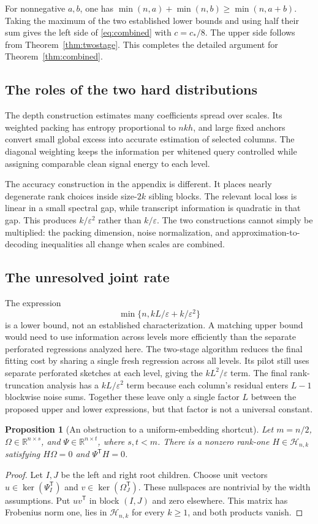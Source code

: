 \documentclass[11pt]{article}
\newtheorem{proposition}[theorem]{Proposition}
\theoremstyle{remark}
\newcommand{\R}{\mathbb R}
\newcommand{\Hclass}{\mathcal H_{n,k}}
\newcommand{\eps}{\varepsilon}
\begin{document}
For nonnegative $a,b$, one has
$\min(n,a)+\min(n,b)\ge\min(n,a+b)$.
Taking the maximum of the two established lower bounds and using half their
sum gives the left side of \eqref{eq:combined} with $c=c_*/8$.
The upper side follows from Theorem~\ref{thm:twostage}.
This completes the detailed argument for Theorem~\ref{thm:combined}.

\subsection{The roles of the two hard distributions}

The depth construction estimates many coefficients spread over scales. Its
weighted packing has entropy proportional to $nkh$, and large fixed anchors
convert small global excess into accurate estimation of selected columns.
The diagonal weighting keeps the information per whitened query controlled
while assigning comparable clean signal energy to each level.

The accuracy construction in the appendix is different. It places nearly
degenerate rank choices inside size-$2k$ sibling blocks. The relevant local
loss is linear in a small spectral gap, while transcript information is
quadratic in that gap. This produces $k/\eps^2$ rather than $k/\eps$.
The two constructions cannot simply be multiplied: the packing dimension,
noise normalization, and approximation-to-decoding inequalities all change
when scales are combined.

\subsection{The unresolved joint rate}

The expression
\[
 \min\{n,kL/\eps+k/\eps^2\}
\]
is a lower bound, not an established characterization. A matching upper
bound would need to use information across levels more efficiently than the
separate perforated regressions analyzed here. The two-stage algorithm reduces the final fitting cost by sharing a single
fresh regression across all levels. Its pilot still uses separate perforated
sketches at each level, giving the $kL^2/\eps$ term. The final rank-truncation
analysis has a $kL/\eps^2$ term because each column's residual enters $L-1$
blockwise noise sums. Together these leave only a single factor $L$ between
the proposed upper and lower expressions, but that factor is not a universal
constant.

\begin{proposition}[An obstruction to a uniform-embedding shortcut]\label{prop:nullspace}
Let $m=n/2$, $\Omega\in\R^{n\times s}$, and $\Psi\in\R^{n\times t}$,
where $s,t<m$. There is a nonzero rank-one $H\in\Hclass$ satisfying
$H\Omega=0$ and $\Psi^{\mathsf T}H=0$.
\end{proposition}
\begin{proof}
Let $I,J$ be the left and right root children. Choose unit vectors
$u\in\ker(\Psi_I^{\mathsf T})$ and
$v\in\ker(\Omega_J^{\mathsf T})$. These nullspaces are nontrivial by the
width assumptions. Put $uv^{\mathsf T}$ in block $(I,J)$ and zero elsewhere.
This matrix has Frobenius norm one, lies in $\Hclass$ for every $k\ge1$, and
both products vanish.
\end{proof}
\end{document}
